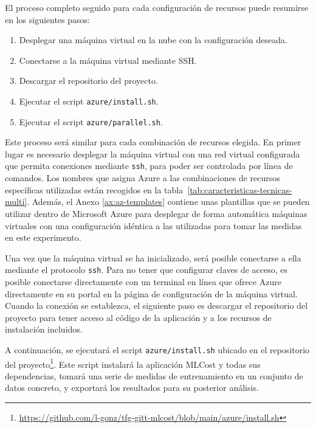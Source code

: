 El proceso completo seguido para cada configuración de recursos puede resumirse en los siguientes pasos:
\begin{enumerate}
    \item Desplegar una máquina virtual en la nube con la configuración deseada.
    \item Conectarse a la máquina virtual mediante SSH.
    \item Descargar el repositorio del proyecto.
    \item Ejecutar el script \texttt{azure/install.sh}.
    \item Ejecutar el script \texttt{azure/parallel.sh}.
\end{enumerate}

Este proceso será similar para cada combinación de recursos elegida. En primer lugar es necesario desplegar la máquina virtual con una red virtual configurada que permita conexiones mediante \texttt{ssh}, para poder ser controlada por línea de comandos. Los nombres que asigna Azure a las combinaciones de recursos específicas utilizadas están recogidos en la tabla~\ref{tab:caracteristicas-tecnicas-multi}. Además, el Anexo \ref{ax:az-templates} contiene unas plantillas que se pueden utilizar dentro de Microsoft Azure para desplegar de forma automática máquinas virtuales con una configuración idéntica a las utilizadas para tomar las medidas en este experimento.

Una vez que la máquina virtual se ha inicializado, será posible conectarse a ella mediante el protocolo \texttt{ssh}. Para no tener que configurar claves de acceso, es posible conectarse directamente con un terminal en línea que ofrece Azure directamente en su portal en la página de configuración de la máquina virtual. Cuando la conexión se establezca, el siguiente paso es descargar el repositorio del proyecto para tener acceso al código de la aplicación y a los recursos de instalación incluidos.


A continuación, se ejecutará el script \texttt{azure/install.sh} ubicado en el repositorio del proyecto\footnote{\url{https://github.com/l-gonz/tfg-gitt-mlcost/blob/main/azure/install.sh}}. Este script instalará la aplicación MLCost y todas sus dependencias, tomará una serie de medidas de entrenamiento en un conjunto de datos concreto, y exportará los resultados para su posterior análisis.


